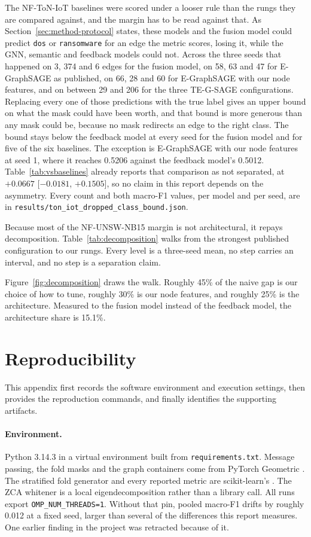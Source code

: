 The NF-ToN-IoT baselines were scored under a looser rule than the rungs they are compared
against, and the margin has to be read against that. As Section~\ref{sec:method-protocol}
states, these models and the fusion model could predict \texttt{dos} or \texttt{ransomware} for
an edge the metric scores, losing it, while the GNN, semantic and feedback models could not.
Across the three seeds that happened on 3, 374 and 6 edges for the fusion model, on 58, 63 and
47 for E-GraphSAGE as published, on 66, 28 and 60 for E-GraphSAGE with our node features, and on
between 29 and 206 for the three TE-G-SAGE configurations. Replacing every one of those
predictions with the true label gives an upper bound on what the mask could have been worth, and
that bound is more generous than any mask could be, because no mask redirects an edge to the
right class. The bound stays below the feedback model at every seed for the fusion model and for
five of the six baselines. The exception is E-GraphSAGE with our node features at seed 1, where
it reaches 0.5206 against the feedback model's 0.5012. Table~\ref{tab:vsbaselines} already
reports that comparison as not separated, at $+0.0667$ [$-0.0181$, $+0.1505$], so no claim in
this report depends on the asymmetry. Every count and both macro-F1 values, per model and per
seed, are in \texttt{results/ton\_iot\_dropped\_class\_bound.json}.

Because most of the NF-UNSW-NB15 margin is not architectural, it repays decomposition.
Table~\ref{tab:decomposition} walks from the strongest published configuration to our rungs.
Every level is a three-seed mean, no step carries an interval, and no step is a separation claim.

Figure~\ref{fig:decomposition} draws the walk. Roughly 45\% of the naive gap is our choice of
how to tune, roughly 30\% is our node features,
and roughly 25\% is the architecture. Measured to the fusion model instead of the feedback model, the architecture
share is 15.1\%.

\clearpage
\section{Reproducibility}
\label{app:repro}

This appendix first records the software environment and execution settings, then provides the reproduction commands, and finally identifies the supporting artifacts.

\paragraph{Environment.} Python 3.14.3 in a virtual environment built from
\texttt{requirements.txt}. Message passing, the fold masks and the graph containers come from
PyTorch Geometric \citep{fey2019pyg}. The stratified fold generator and every reported metric
are scikit-learn's \citep{pedregosa2011sklearn}. The ZCA whitener is a local
eigendecomposition rather than a library call. All runs export \texttt{OMP\_NUM\_THREADS=1}. Without that pin,
pooled macro-F1 drifts by roughly 0.012 at a fixed seed, larger than several of the
differences this report measures. One earlier finding in the project was retracted because
of it.

